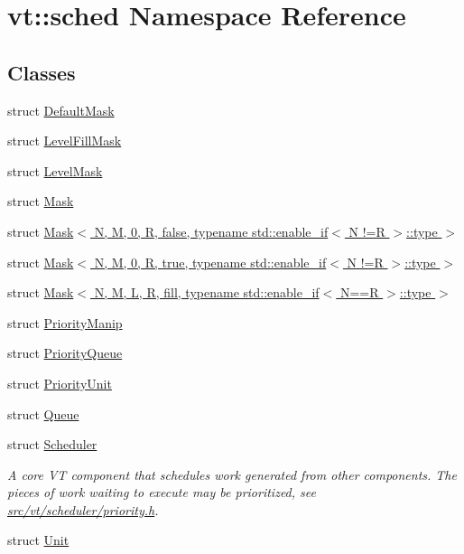 \hypertarget{namespacevt_1_1sched}{}\section{vt\+:\+:sched Namespace Reference}
\label{namespacevt_1_1sched}
\subsection*{Classes}
\begin{DoxyCompactItemize}
\item 
struct \hyperlink{structvt_1_1sched_1_1_default_mask}{Default\+Mask}
\item 
struct \hyperlink{structvt_1_1sched_1_1_level_fill_mask}{Level\+Fill\+Mask}
\item 
struct \hyperlink{structvt_1_1sched_1_1_level_mask}{Level\+Mask}
\item 
struct \hyperlink{structvt_1_1sched_1_1_mask}{Mask}
\item 
struct \hyperlink{structvt_1_1sched_1_1_mask_3_01_n_00_01_m_00_010_00_01_r_00_01false_00_01typename_01std_1_1enabl81bb113ca3757a124cb0c647589aa3dd}{Mask$<$ N, M, 0, R, false, typename std\+::enable\+\_\+if$<$ N !=\+R $>$\+::type $>$}
\item 
struct \hyperlink{structvt_1_1sched_1_1_mask_3_01_n_00_01_m_00_010_00_01_r_00_01true_00_01typename_01std_1_1enable84a8b0b373fb69b0fca50672234c2a86}{Mask$<$ N, M, 0, R, true, typename std\+::enable\+\_\+if$<$ N !=\+R $>$\+::type $>$}
\item 
struct \hyperlink{structvt_1_1sched_1_1_mask_3_01_n_00_01_m_00_01_l_00_01_r_00_01fill_00_01typename_01std_1_1enablb425bc242171a4de39f2db76b78da09f}{Mask$<$ N, M, L, R, fill, typename std\+::enable\+\_\+if$<$ N==\+R $>$\+::type $>$}
\item 
struct \hyperlink{structvt_1_1sched_1_1_priority_manip}{Priority\+Manip}
\item 
struct \hyperlink{structvt_1_1sched_1_1_priority_queue}{Priority\+Queue}
\item 
struct \hyperlink{structvt_1_1sched_1_1_priority_unit}{Priority\+Unit}
\item 
struct \hyperlink{structvt_1_1sched_1_1_queue}{Queue}
\item 
struct \hyperlink{structvt_1_1sched_1_1_scheduler}{Scheduler}
\begin{DoxyCompactList}\small\item\em A core VT component that schedules work generated from other components. The pieces of work waiting to execute may be prioritized, see \hyperlink{priority_8h}{src/vt/scheduler/priority.\+h}. \end{DoxyCompactList}\item 
struct \hyperlink{structvt_1_1sched_1_1_unit}{Unit}
\end{DoxyCompactItemize}
